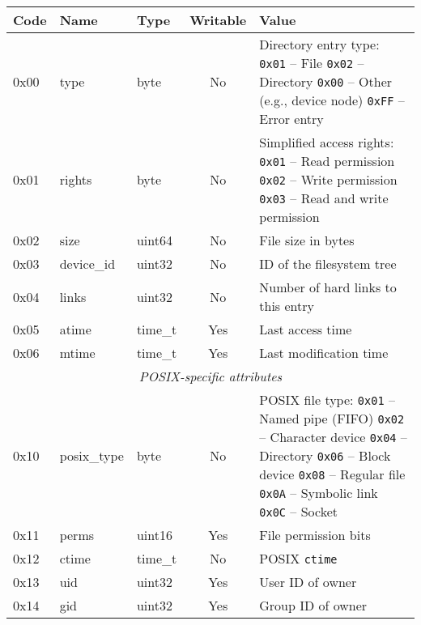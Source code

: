 \begin{table}
\begin{center}

\def\tline#1#2#3{
{\ttfamily #1} & {\ttfamily #2} & {\ttfamily #3}
}
\begin{tabular}{lllcp{6cm}}
	\hline
	Code & Name & Type & Writable & Value \\
	\hline
	\tline{0x00}{type}{byte} & No &
		Directory entry type: \newline
		{\tt 0x01} -- File \newline
		{\tt 0x02} -- Directory \newline
		{\tt 0x00} -- Other (e.g., device node) \newline
		{\tt 0xFF} -- Error entry
		\\
	\tline{0x01}{rights}{byte} & No &
		Simplified access rights:\newline
		{\tt 0x01} -- Read permission \newline
		{\tt 0x02} -- Write permission \newline
		{\tt 0x03} -- Read and write permission
		\\
	\tline{0x02}{size}{uint64} & No & File size in bytes \\
	\tline{0x03}{device\_id}{uint32} & No & ID of the filesystem tree\footnotemark[1] \\
	\tline{0x04}{links}{uint32} & No & Number of hard links to this entry \\
	\tline{0x05}{atime}{time\_t} & Yes & Last access time \\
	\tline{0x06}{mtime}{time\_t} & Yes & Last modification time \\

	\hline
	\multicolumn{5}{c}{\textit{POSIX-specific attributes}} \\
	\hline

	\tline{0x10}{posix\_type}{byte} & No &
		POSIX file type:\footnotemark[2] \newline
		{\tt 0x01} -- Named pipe (FIFO) \newline
		{\tt 0x02} -- Character device \newline
		{\tt 0x04} -- Directory \newline
		{\tt 0x06} -- Block device \newline
		{\tt 0x08} -- Regular file \newline
		{\tt 0x0A} -- Symbolic link \newline
		{\tt 0x0C} -- Socket
		\\
	\tline{0x11}{perms}{uint16} & Yes & File permission bits\footnotemark[3] \\
	\tline{0x12}{ctime}{time\_t} & No & POSIX {\tt ctime} \\
	\tline{0x13}{uid}{uint32} & Yes & User ID of owner \\
	\tline{0x14}{gid}{uint32} & Yes & Group ID of owner \\


\end{tabular}
\end{center}
\end{table}
